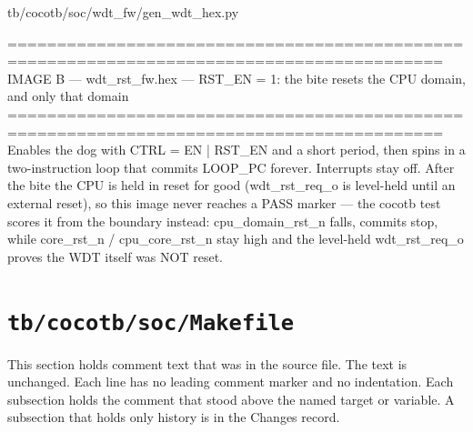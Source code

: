 \begin{relocated}{tb/cocotb/soc/wdt_fw/gen_wdt_hex.py}
\begin{textblock}
==========================================================================================
IMAGE B — wdt_rst_fw.hex — RST_EN = 1: the bite resets the CPU domain, and only that domain
==========================================================================================
Enables the dog with CTRL = EN | RST_EN and a short period, then spins in a two-instruction
loop that commits LOOP_PC forever. Interrupts stay off. After the bite the CPU is held in
reset for good (wdt_rst_req_o is level-held until an external reset), so this image never
reaches a PASS marker — the cocotb test scores it from the boundary instead: cpu_domain_rst_n
falls, commits stop, while core_rst_n / cpu_core_rst_n stay high and the level-held
wdt_rst_req_o proves the WDT itself was NOT reset.
\end{textblock}

\end{relocated}

\section{\texttt{tb/cocotb/soc/Makefile}}\label{tm:suite:soc-makefile}

This section holds comment text that was in the source file. The text is unchanged. Each line has no leading comment marker and no indentation. Each subsection holds the comment that stood above the named target or variable. A subsection that holds only history is in the Changes record.

